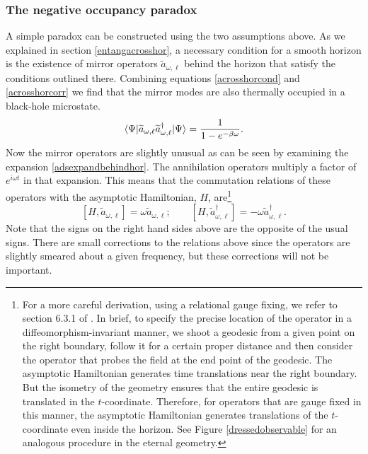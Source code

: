 \documentclass[12pt]{article}
\newcommand{\cop}[1]{#1}
\def\ta{\widetilde{\cop{a}}}
\newcommand{\be}{\begin{equation}}
\newcommand{\ee}{\end{equation}}
\begin{document}
\subsubsection{The negative occupancy paradox}

A simple paradox can be constructed using the two assumptions above. As we explained in section \ref{entangacrosshor}, a necessary condition for a smooth horizon is the existence of mirror operators $\ta_{\omega, \ell}$ behind the horizon
that satisfy the conditions outlined there. Combining equations \eqref{acrosshorcond} and \eqref{acrosshorcorr} we find that the mirror modes are also thermally occupied in a black-hole microstate.
\be
\label{mirroroccupancy}
\langle \Psi|  \ta_{\omega, \ell} \ta^{\dagger}_{\omega, \ell} |\Psi \rangle = {1 \over 1 - e^{-\beta \omega}}.
\ee
Now the mirror operators are slightly unusual as can be seen by examining the expansion \eqref{adsexpandbehindhor}.  The annihilation operators multiply a factor of $e^{i \omega t}$ in that expansion. This means that the
commutation relations of these operators with the asymptotic Hamiltonian, $H$,  are\footnote{For a more careful
derivation, using a relational gauge fixing, we refer to section 6.3.1 of  \cite{Papadodimas:2015xma}. In brief, to specify the precise location of the operator in a diffeomorphism-invariant manner,  we shoot a geodesic from a given point on the right boundary, follow it for a certain proper distance and then consider the operator that probes the field at the end point of  the geodesic. The asymptotic Hamiltonian generates time translations near the right boundary. But the isometry of the geometry ensures that the entire geodesic is translated in the $t$-coordinate. Therefore, for operators that are gauge fixed in this manner, the asymptotic Hamiltonian generates translations of the $t$-coordinate even inside the horizon. See Figure \ref{dressedobservable} for an analogous procedure in the eternal geometry.
}
\be
\label{commuthamilt}
[H, \ta_{\omega, \ell}] = \omega \ta_{\omega, \ell}; \qquad [H, \ta_{\omega, \ell}^{\dagger}] = -\omega \ta_{\omega, \ell}^{\dagger}.
\ee
Note that the signs on the right hand sides above are the opposite of the usual signs. There are small corrections to the relations above since the operators are slightly smeared about a given frequency, but these corrections
will not be important.
\end{document}
